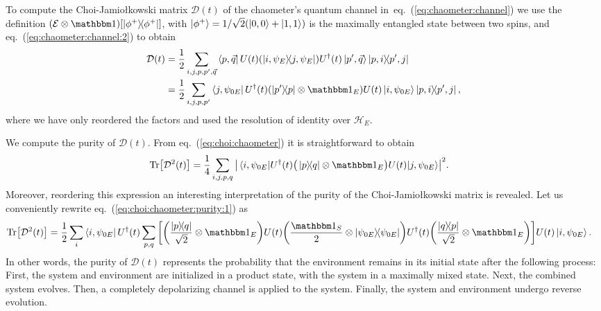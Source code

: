 \documentclass[10pt,letterpaper]{article}
\newcommand{\eref}[1]{eq.~(\ref{#1})}
\newcommand{\mcE}{\mathcal E}
\newcommand{\mcD}{\mathcal D}
\newcommand{\mcH}{\mathcal H}
\newcommand{\jami}{Jamiołkowski}
\begin{document}
To compute the Choi-\jami{} matrix $\mcD(t)$ of the chaometer's quantum channel 
in~\eref{eq:chaometer:channel} we use the definition 
$\qty(\mcE \otimes \one) \qty[\dyad{\phi^+}]$, with $\ket{\phi^+}=1/\sqrt{2}\qty(\ket{0,0} + \ket{1,1})$
is the maximally entangled state between two spins, and \eref{eq:chaometer:channel:2} to obtain
\begin{align}
\mcD(t) &=  
\frac{1}{2} 
\sum_{i, j, p, p', \vec q}
\bra{p, \vec q}
U(t) \qty(\dyad{i,\psi_{E}}{j,\psi_{E}}) U^\dagger(t)
\ket{p', \vec q}
\dyad{p,i}{p',j} \\
&= \label{eq:choi:chaometer:computational:basis}
\frac{1}{2}
\sum_{i, j, p, p'}
\bra{j, \psi_{0E}} U^\dagger(t) \qty( \dyad{p'}{p}\otimes \one_E ) U(t)
\ket{i, \psi_{0E}} \dyad{p, i}{p', j},
\end{align}
where we have only reordered the factors and used the resolution of identity over 
$\mcH_E$.

We compute the purity of $\mcD(t)$. From \eref{eq:choi:chaometer} 
it is straightforward to obtain
\begin{align}\label{eq:choi:chaometer:purity:1}
\Tr[\mcD^2(t)]  &= 
\frac{1}{4}
\sum_{i,j,p,q}
\abs{\matrixel{i, \psi_{0E}}
{U^\dagger(t) \big(\dyad{p}{q} \otimes \one_E\big) U(t)}
{j, \psi_{0E}}
}^2.
\end{align}
Moreover, reordering this expression an interesting interpretation of the purity 
of the Choi-\jami{} matrix is revealed. Let us conveniently rewrite
\eref{eq:choi:chaometer:purity:1} as
\begin{align}\label{eq:choi:chaometer:purity:2}
\Tr[\mcD^2(t)]  &= 
\frac{1}{2}
\sum_i
\bra{i, \psi_{0E}}
U^\dagger(t) 
\sum_{p, q} \qty[
\qty(\frac{\dyad{p}{q}}{\sqrt{2}} \otimes \one_E ) 
U(t)
\qty( \frac{\one_S}{2} \otimes \dyad{\psi_{0E}})
U^\dagger(t) 
\qty(\frac{\dyad{q}{p}}{\sqrt{2}} \otimes \one_E ) 
]
U(t)
\ket{i, \psi_{0E}}.
\end{align}
In other words, the purity of $\mcD(t)$ represents the probability that the 
environment remains in its initial state after the following process: First, the system
and environment are initialized in a product state, with the system in a maximally
mixed state. Next, the combined system evolves. Then, a completely depolarizing
channel is applied to the system. Finally, the system and environment undergo 
reverse evolution.
\end{document}
